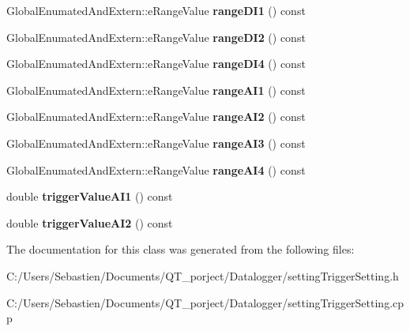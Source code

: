 \begin{DoxyCompactItemize}
\item 
\mbox{\label{class_setting_trigger_setting_a2a48c14280cf175568de4787fbb75e70}} 
Global\+Enumated\+And\+Extern\+::e\+Range\+Value {\bfseries range\+D\+I1} () const
\item 
\mbox{\label{class_setting_trigger_setting_a1b58f153e72014ae707c2ee08d1a99c9}} 
Global\+Enumated\+And\+Extern\+::e\+Range\+Value {\bfseries range\+D\+I2} () const
\item 
\mbox{\label{class_setting_trigger_setting_a9d0fe62d93653be849611ea478f14066}} 
Global\+Enumated\+And\+Extern\+::e\+Range\+Value {\bfseries range\+D\+I4} () const
\item 
\mbox{\label{class_setting_trigger_setting_acad35b03d4f66196c4cad14310987d87}} 
Global\+Enumated\+And\+Extern\+::e\+Range\+Value {\bfseries range\+A\+I1} () const
\item 
\mbox{\label{class_setting_trigger_setting_aa7ce558380f2018189dfa4aa9c4afb20}} 
Global\+Enumated\+And\+Extern\+::e\+Range\+Value {\bfseries range\+A\+I2} () const
\item 
\mbox{\label{class_setting_trigger_setting_a10faff909bf3313222cf16339e7c3170}} 
Global\+Enumated\+And\+Extern\+::e\+Range\+Value {\bfseries range\+A\+I3} () const
\item 
\mbox{\label{class_setting_trigger_setting_aec6471d8c3b43b79fa6dc1c8b531f153}} 
Global\+Enumated\+And\+Extern\+::e\+Range\+Value {\bfseries range\+A\+I4} () const
\item 
\mbox{\label{class_setting_trigger_setting_afa790ff48a2e4a549e2f62dacc6c64f8}} 
double {\bfseries trigger\+Value\+A\+I1} () const
\item 
\mbox{\label{class_setting_trigger_setting_a5ff613ab85105fb6809d1358514389f4}} 
double {\bfseries trigger\+Value\+A\+I2} () const
\end{DoxyCompactItemize}


The documentation for this class was generated from the following files\+:\begin{DoxyCompactItemize}
\item 
C\+:/\+Users/\+Sebastien/\+Documents/\+Q\+T\+\_\+porject/\+Datalogger/setting\+Trigger\+Setting.\+h\item 
C\+:/\+Users/\+Sebastien/\+Documents/\+Q\+T\+\_\+porject/\+Datalogger/setting\+Trigger\+Setting.\+cpp\end{DoxyCompactItemize}
